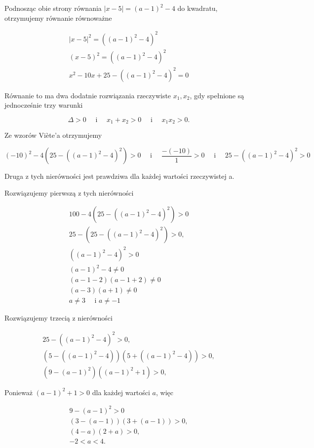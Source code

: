 \documentclass[10pt]{article}
\begin{document}
Podnosząc obie strony równania $|x-5|=(a-1)^{2}-4$ do kwadratu, otrzymujemy równanie równoważne

$$
\begin{gathered}
|x-5|^{2}=\left((a-1)^{2}-4\right)^{2} \\
(x-5)^{2}=\left((a-1)^{2}-4\right)^{2} \\
x^{2}-10 x+25-\left((a-1)^{2}-4\right)^{2}=0
\end{gathered}
$$

Równanie to ma dwa dodatnie rozwiązania rzeczywiste $x_{1}, x_{2}$, gdy spełnione są jednocześnie trzy warunki

$$
\Delta>0 \quad \text { i } \quad x_{1}+x_{2}>0 \quad \text { i } \quad x_{1} x_{2}>0 .
$$

Ze wzorów Viète'a otrzymujemy

$$
(-10)^{2}-4\left(25-\left((a-1)^{2}-4\right)^{2}\right)>0 \quad \text { i } \quad \frac{-(-10)}{1}>0 \quad \text { i } \quad 25-\left((a-1)^{2}-4\right)^{2}>0
$$

Druga z tych nierówności jest prawdziwa dla każdej wartości rzeczywistej a.

Rozwiązujemy pierwszą z tych nierówności

$$
\begin{gathered}
100-4\left(25-\left((a-1)^{2}-4\right)^{2}\right)>0 \\
25-\left(25-\left((a-1)^{2}-4\right)^{2}\right)>0, \\
\left((a-1)^{2}-4\right)^{2}>0 \\
(a-1)^{2}-4 \neq 0 \\
(a-1-2)(a-1+2) \neq 0 \\
(a-3)(a+1) \neq 0 \\
a \neq 3 \quad \text { i } a \neq-1
\end{gathered}
$$

Rozwiązujemy trzecią z nierówności

$$
\begin{gathered}
25-\left((a-1)^{2}-4\right)^{2}>0, \\
\left(5-\left((a-1)^{2}-4\right)\right)\left(5+\left((a-1)^{2}-4\right)\right)>0, \\
\left(9-(a-1)^{2}\right)\left((a-1)^{2}+1\right)>0,
\end{gathered}
$$

Ponieważ $(a-1)^{2}+1>0$ dla każdej wartości $a$, więc

$$
\begin{gathered}
9-(a-1)^{2}>0 \\
(3-(a-1))(3+(a-1))>0, \\
(4-a)(2+a)>0, \\
-2<a<4 .
\end{gathered}
$$
\end{document}
